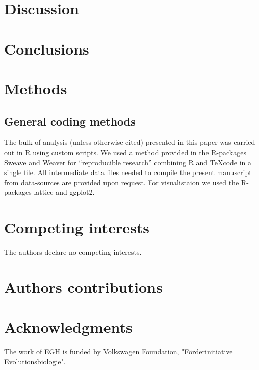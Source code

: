 \documentclass[10pt]{bmc_article}
\newenvironment{bmcformat}{\begin{raggedright}\baselineskip20pt\sloppy\setboolean{publ}{false}}{\end{raggedright}\baselineskip20pt\sloppy}
\begin{document}
\begin{bmcformat}
\section*{Discussion}

\section*{Conclusions}

\section*{Methods}

\subsection*{General coding methods}

The bulk of analysis (unless otherwise cited) presented in this paper
was carried out in R \cite{R_project} using custom scripts. We used a
method provided in the R-packages
Sweave\cite{lmucs-papers:Leisch:2002} and Weaver\cite{weaver} for
``reproducible research'' combining R and \TeX code in a single
file. All intermediate data files needed to compile the present
manuscript from data-sources are provided upon request. For
visualistaion we used the R-packages lattice\cite{lattice-book} and
ggplot2\cite{ggplot-book}.


\section*{Competing interests}
The authors declare no competing interests.

\section*{Authors contributions}

\section*{Acknowledgments}

The work of EGH is funded by
Volkswagen Foundation, "F\"{o}rderinitiative Evolutionsbiologie".
 

\end{bmcformat}
\end{document}
